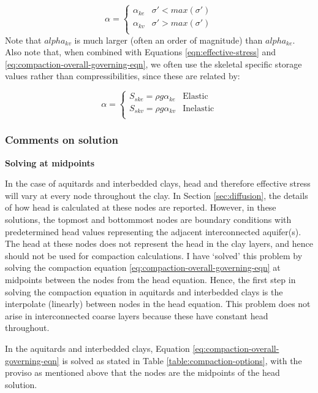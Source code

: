 \documentclass{article}
\begin{document}
\begin{equation}
\label{eq:compressibility-clays}
\alpha = 
\begin{cases}
\alpha_{ke} & \sigma' < max(\sigma') \\
\alpha_{kv} & \sigma' > max(\sigma') \\
\end{cases}
\end{equation}
Note that $alpha_{kv}$ is much larger (often an order of magnitude) than $alpha_{ke}$. Also note that, when combined with Equations \ref{eqn:effective-stress} and \ref{eq:compaction-overall-governing-eqn}, we often use the skeletal specific storage values rather than compressibilities, since these are related by:

\begin{equation}
\label{eq:skeletal-specific-storage}
\alpha = 
\begin{cases}
S_{ske} = \rho g \alpha_{ke} & \text{Elastic} \\
S_{skv} = \rho g \alpha_{kv} & \text{Inelastic} \\
\end{cases}
\end{equation}

\subsubsection{Comments on solution}

\textbf{Solving at midpoints}

In the case of aquitards and interbedded clays, head and therefore effective stress will vary at every node throughout the clay. In Section \ref{sec:diffusion}, the details of how head is calculated at these nodes are reported. However, in these solutions, the topmost and bottommost nodes are boundary conditions with predetermined head values representing the adjacent interconnected aquifer(s). The head at these nodes does not represent the head in the clay layers, and hence should not be used for compaction calculations. I have `solved' this problem by solving the compaction equation \ref{eq:compaction-overall-governing-eqn} at midpoints between the nodes from the head equation. Hence, the first step in solving the compaction equation in aquitards and interbedded clays is the interpolate (linearly) between nodes in the head equation. This problem does not arise in interconnected coarse layers because these have constant head throughout.

In the aquitards and interbedded clays, Equation \ref{eq:compaction-overall-governing-eqn} is solved as stated in Table \ref{table:compaction-options}, with the proviso as mentioned above that the nodes are the midpoints of the head solution. 
\end{document}
